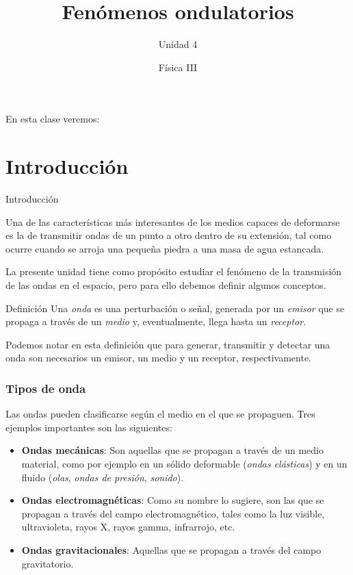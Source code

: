 \documentclass[11pt,handout,aspectratio=1610]{beamer}
\title{Fenómenos ondulatorios}
\subtitle{Unidad 4}
\author{Física III}
\institute{Instituto de Tecnología e Ingeniería \\ \vspace{0.25cm} Universidad Nacional de Hurlingham}
\date{ }
\newcommand{\vs}{\vspace{11pt}}
\begin{document}
\frame{\titlepage}

\begin{frame}{En esta clase veremos:}
    \tableofcontents
\end{frame}

\section{Introducción}

\begin{frame}{Introducción}

    Una de las características más interesantes de los medios capaces de deformarse es la de transmitir ondas de un punto a otro dentro de su extensión, tal como ocurre cuando se arroja una pequeña piedra a una masa de agua estancada.

    \vs

    La presente unidad tiene como propósito estudiar el fenómeno de la transmisión de las ondas en el espacio, pero para ello debemos definir algunos conceptos.

    \begin{block}{Definición}
        Una \emph{onda} es una perturbación o señal, generada por un \emph{emisor} que se propaga a través de un \emph{medio} y, eventualmente, llega hasta un \emph{receptor}.  
    \end{block}

    Podemos notar en esta definición que para generar, transmitir y detectar una onda son necesarios un emisor, un medio y un receptor, respectivamente.

\end{frame}

\begin{frame}
    \frametitle{Tipos de onda}

    Las ondas pueden clasificarse según el medio en el que se propaguen. Tres ejemplos importantes son las siguientes:
    \begin{itemize}
        \item \textbf{Ondas mecánicas}: Son aquellas que se propagan a través de un medio material, como por ejemplo en un sólido deformable (\emph{ondas elásticas}) y en un fluido (\emph{olas}, \emph{ondas de presión}, \emph{sonido}).
        \item \textbf{Ondas electromagnéticas}: Como su nombre lo sugiere, son las que se propagan a través del campo electromagnético, tales como la luz visible, ultravioleta, rayos X, rayos gamma, infrarrojo, etc.
        \item \textbf{Ondas gravitacionales}: Aquellas que se propagan a través del campo gravitatorio.
    \end{itemize}

\end{frame}
\end{document}
